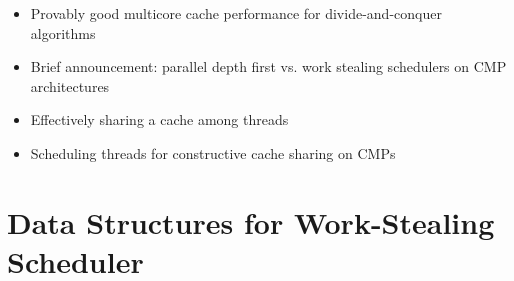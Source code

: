 \begin{itemize}
\item Provably good multicore cache performance for divide-and-conquer
  algorithms \cite{Blelloch2008}
\item Brief announcement: parallel depth first vs. work stealing
  schedulers on CMP architectures \cite{Liaskovitis2006}
\item Effectively sharing a cache among threads \cite{Blelloch2004}
\item Scheduling threads for constructive cache sharing on CMPs
  \cite{Chen2007}
\end{itemize}


\section*{Data Structures for Work-Stealing Scheduler}
\label{sec:lr-data-structures-for-work-stealing-scheduler}

